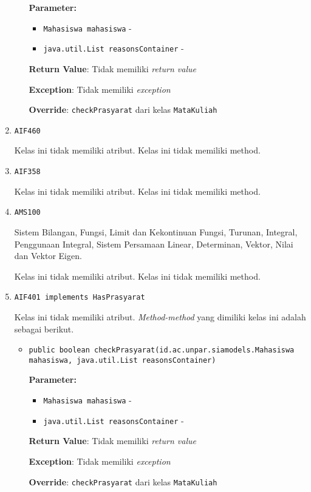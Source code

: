 \documentclass{article}
\begin{document}
\begin{enumerate}
\begin{itemize}
\textbf{Parameter:}
\begin{itemize}
\item \texttt{Mahasiswa mahasiswa} - 
\item \texttt{java.util.List reasonsContainer} - 
\end{itemize}
\textbf{Return Value}: Tidak memiliki \textit{return value}

\textbf{Exception}: Tidak memiliki \textit{exception}

\textbf{Override}: \texttt{checkPrasyarat} dari kelas \texttt{MataKuliah}

\end{itemize}
\item \texttt{AIF460}



Kelas ini tidak memiliki atribut. Kelas ini tidak memiliki method. \item \texttt{AIF358}



Kelas ini tidak memiliki atribut. Kelas ini tidak memiliki method. \item \texttt{AMS100}

Sistem Bilangan, Fungsi, Limit dan Kekontinuan Fungsi, Turunan, Integral, 
 Penggunaan Integral, Sistem Persamaan Linear, Determinan, Vektor, Nilai dan 
 Vektor Eigen.

Kelas ini tidak memiliki atribut. Kelas ini tidak memiliki method. \item \texttt{AIF401 implements HasPrasyarat}



Kelas ini tidak memiliki atribut. \textit{Method-method} yang dimiliki kelas ini adalah sebagai berikut.
\begin{itemize}
\item \texttt{public boolean checkPrasyarat(id.ac.unpar.siamodels.Mahasiswa mahasiswa, java.util.List reasonsContainer)}



\textbf{Parameter:}
\begin{itemize}
\item \texttt{Mahasiswa mahasiswa} - 
\item \texttt{java.util.List reasonsContainer} - 
\end{itemize}
\textbf{Return Value}: Tidak memiliki \textit{return value}

\textbf{Exception}: Tidak memiliki \textit{exception}

\textbf{Override}: \texttt{checkPrasyarat} dari kelas \texttt{MataKuliah}


\end{itemize}
\end{enumerate}
\end{document}
